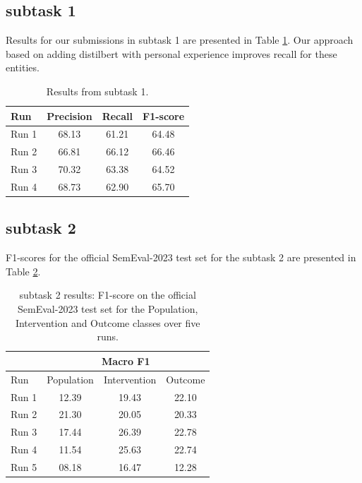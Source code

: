 \documentclass[11pt]{article}
\begin{document}
\subsection{subtask 1}

Results for our submissions in subtask 1 are presented in Table \ref{tab:task_1}. Our approach based on adding distilbert with personal experience improves recall for these entities.

\begin{table}[ht]
    \centering
    \begin{tabular}{lccc}
        \toprule
        Run & Precision & Recall & F1-score \\
        \midrule
        Run 1 & 68.13 & 61.21 & 64.48 \\
        Run 2 & 66.81 & 66.12 & 66.46 \\
        Run 3 & 70.32 & 63.38 & 64.52 \\
        Run 4 & 68.73 & 62.90 & 65.70 \\
        \bottomrule
    \end{tabular}
    \caption{Results from subtask 1.}
    \label{tab:task_1}
\end{table}
%
%
%
\subsection{subtask 2}
\label{res:task2}
%
F1-scores for the official SemEval-2023 test set for the subtask 2 are presented in Table \ref{tab:task_2}.

%
\begin{table}[ht]
    \centering
    \begin{tabular}{lccc}
        \toprule
          & \multicolumn{3}{c}{Macro F1} \\
         \hline
        Run & Population & Intervention & Outcome \\
        \midrule
        Run 1 & 12.39 & 19.43 & 22.10 \\
        Run 2 & 21.30 & 20.05 & 20.33 \\
        Run 3 & 17.44 & 26.39 & 22.78 \\
        Run 4 & 11.54 & 25.63 & 22.74 \\
        Run 5 & 08.18 & 16.47 & 12.28 \\
        \bottomrule
    \end{tabular}
    \caption{subtask 2 results: F1-score on the official SemEval-2023 test set for the Population, Intervention and Outcome classes over five runs.}
    \label{tab:task_2}
\end{table}
\end{document}
